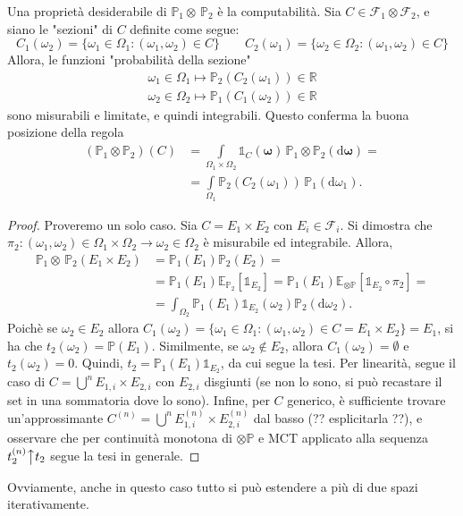 Una proprietà desiderabile di $\mathbb{P}_1 \otimes \,\mathbb{P}_2$ è la computabilità.
Sia $C \in \mathcal{F}_1 \otimes \mathcal{F}_2$, e siano le "sezioni" di $C$ definite come segue:
\[
	C_1 (\omega_2) = \{ \omega_1 \in \Omega_1 : (\omega_1,\omega_2) \in C \} \qquad
	C_2 (\omega_1) = \{ \omega_2 \in \Omega_2 : (\omega_1,\omega_2) \in C \}	
\]
Allora, le funzioni "probabilità della sezione"
\begin{gather*}
	\omega_1 \in \Omega_1 \longmapsto  \mathbb{P}_2 ( C_2 (\omega_1)) \in \mathbb{R} \\
	\omega_2 \in \Omega_2 \longmapsto  \mathbb{P}_1 ( C_1 (\omega_2)) \in \mathbb{R}
\end{gather*}
sono misurabili e limitate, e quindi integrabili.
Questo conferma la buona posizione della regola
\begin{align*}
	(\mathbb{P}_1 \! \otimes \mathbb{P}_2) (C) &= \! \int\limits_{\Omega_1\times\Omega_2} \mathbb{1}_C(\boldsymbol{\omega}) \, \mathbb{P}_1 \! \otimes \mathbb{P}_2(\mathrm{d}\boldsymbol{\omega}) = \\
	&= \int\limits_{\Omega_1} \mathbb{P}_2(C_2(\omega_1)) \, \mathbb{P}_1 (\mathrm{d}\omega_1).
\end{align*}
\begin{proof}
	Proveremo un solo caso. Sia $C = E_1 \times E_2$ con $E_i \in \mathcal{F}_i$. Si dimostra che $\pi_2 : (\omega_1,\omega_2) \in \Omega_1 \times \Omega_2 \to \omega_2 \in \Omega_2$ è misurabile ed integrabile. Allora,
	\begin{align*}
		\mathbb{P}_1 \otimes \, \mathbb{P}_2 (E_1 \times E_2) &
			= \mathbb{P}_1(E_1)\mathbb{P}_2(E_2) = \\
			& = \mathbb{P}_1(E_1) \mathbb{E}_{\mathbb{P}_2}[\mathbb{1}_{E_2}]
			= \mathbb{P}_1(E_1) \mathbb{E}_{\otimes\mathbb{P}}[\mathbb{1}_{E_2} \circ \pi_2]= \\
			& = \int_{\Omega_2} \mathbb{P}_1(E_1) \mathbb{1}_{E_2}(\omega_2) \mathbb{P}_2(\mathrm{d}\omega_2).
	\end{align*}
	Poichè se $\omega_2 \in E_2$ allora $C_1(\omega_2)=\{ \omega_1 \in \Omega_1 : (\omega_1,\omega_2) \in C = E_1 \times E_2 \}=E_1$, si ha che $t_2(\omega_2) = \mathbb{P}(E_1)$. Similmente, se $\omega_2 \notin E_2$, allora $C_1(\omega_2)=\emptyset$ e $t_2(\omega_2) = 0$. Quindi, $t_2 = \mathbb{P}_1(E_1) \mathbb{1}_{E_2}$, da cui segue la tesi. Per linearità, segue il caso di $C=\bigcup^n E_{1,i} \times E_{2,i}$ con $E_{2,i}$ disgiunti (se non lo sono, si può recastare il set in una sommatoria dove lo sono). Infine, per $C$ generico, è sufficiente trovare un'approssimante $C^{(n)}=\bigcup^n E_{1,i}^{(n)} \times E_{2,i}^{(n)}$ dal basso (?? esplicitarla ??), e osservare che per continuità monotona di $\otimes \mathbb{P}$ e MCT applicato alla sequenza $t_2^{(n)} \big\uparrow t_2$ segue la tesi in generale.
\end{proof}
Ovviamente, anche in questo caso tutto si può estendere a più di due spazi iterativamente.

